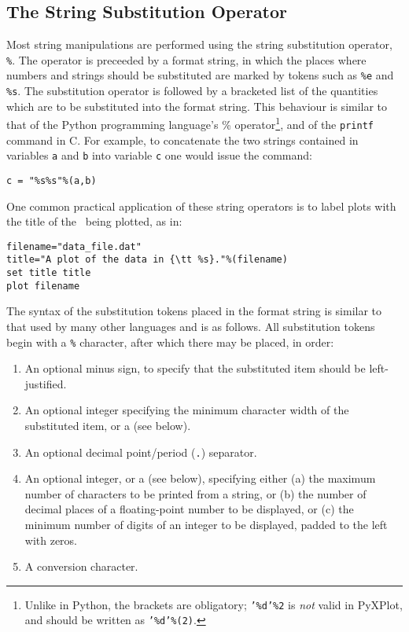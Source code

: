\subsection{The String Substitution Operator}
\label{sec:stringsubop}

Most string manipulations are performed using the string substitution operator,
{\tt \%}. The operator is preceeded by a
format string, in which the places where numbers and strings should be
substituted are marked by tokens such as {\tt \%e} and {\tt \%s}. The
substitution operator is followed by a bracketed list of the quantities which
are to be substituted into the format string. This behaviour is similar to that
of the Python programming language's \% operator\footnote{Unlike in Python, the
brackets are obligatory; {\tt '\%d'\%2} is {\it not} valid in PyXPlot, and
should be written as {\tt '\%d'\%(2)}.}, and of the {\tt printf} command in C.
For example, to concatenate the two strings contained in variables {\tt a} and
{\tt b} into variable {\tt c} one would issue the command:
\begin{verbatim}
c = "%s%s"%(a,b)
\end{verbatim}

One common practical application of these string operators is to label plots
with the title of the \datafile\ being plotted, as in:
\begin{verbatim}
filename="data_file.dat"
title="A plot of the data in {\tt %s}."%(filename)
set title title
plot filename
\end{verbatim}

The syntax of the substitution tokens placed in the format string is similar to
that used by many other languages and is as follows. All substitution tokens
begin with a {\tt \%} character, after which there may be placed, in order:

\begin{enumerate}
\item An optional minus sign, to specify that the substituted item should be left-justified.
\item An optional integer specifying the minimum character width of the substituted item, or a {\tt *} (see below).
\item An optional decimal point/period ({\tt .}) separator.
\item An optional integer, or a {\tt *} (see below), specifying either (a) the maximum number of characters to be printed from a string, or (b) the number of decimal places of a floating-point number to be displayed, or (c) the minimum number of digits of an integer to be displayed, padded to the left with zeros.
\item A conversion character.
\end{enumerate}

